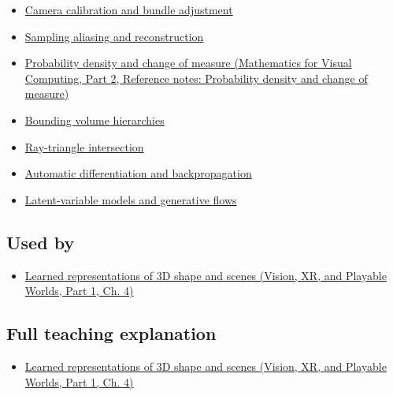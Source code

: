 \hypertarget{appendix-c5b332e400e7-prerequisites}{}

\begin{itemize}
\tightlist
\item
  \hyperref[appendix-3ee9861904d5]{Camera calibration and bundle adjustment}
\item
  \hyperref[appendix-6a7869dd79a6]{Sampling aliasing and reconstruction}
\item
  \href{../02-Mathematics-for-Visual-Computing-P02/main.pdf\#appendix-4815cd87ab8b}{Probability density and change of measure (Mathematics for Visual Computing, Part 2, Reference notes: Probability density and change of measure)}
\item
  \hyperref[appendix-0b426c47dd78]{Bounding volume hierarchies}
\item
  \hyperref[appendix-47ac1bd6d144]{Ray-triangle intersection}
\item
  \hyperref[appendix-40df0855b4a7]{Automatic differentiation and backpropagation}
\item
  \hyperref[appendix-2c568f05ee34]{Latent-variable models and generative flows}
\end{itemize}

\subsection{Used by}\label{appendix-c5b332e400e7-used-by}

\hypertarget{appendix-c5b332e400e7-used-by}{}

\begin{itemize}
\tightlist
\item
  \href{../07-Vision-XR-and-Playable-Worlds-P01/main.pdf\#04-visual-computing-ii-ch034-learned-representations-of-3d-shape-and-scenes}{Learned representations of 3D shape and scenes (Vision, XR, and Playable Worlds, Part 1, Ch. 4)}
\end{itemize}

\subsection{Full teaching explanation}\label{appendix-c5b332e400e7-full-teaching-explanation}

\hypertarget{appendix-c5b332e400e7-full-teaching-explanation}{}

\begin{itemize}
\tightlist
\item
  \href{../07-Vision-XR-and-Playable-Worlds-P01/main.pdf\#04-visual-computing-ii-ch034-learned-representations-of-3d-shape-and-scenes}{Learned representations of 3D shape and scenes (Vision, XR, and Playable Worlds, Part 1, Ch. 4)}
\end{itemize}


